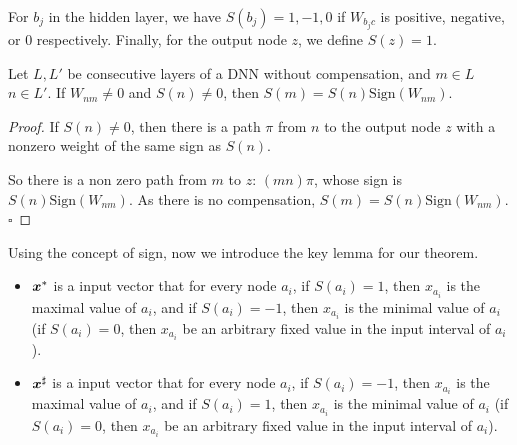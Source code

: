 For $b_j$ in the hidden layer, we have $S(b_j)=1,-1,0$ if $W_{b_j c}$ is positive, negative, or 0 respectively. Finally, for the output node $z$, we define $S(z)=1$.



\begin{lemma}[Sign]
	\label{lemma1}
	Let $L,L'$ be consecutive layers of a DNN without compensation, 
	and $m\in L$ $n\in L'$. If
	$W_{nm} \neq 0$ and $S(n) \neq 0$, then 
	$S(m)=S(n)\mathrm{Sign}(W_{n m})$.
\end{lemma}

\begin{proof}
	If $S(n) \neq 0$, then there is a path $\pi$ from $n$ to the output node $z$ with a nonzero weight of the same sign as $S(n)$. 
	
	So there is a non zero path from $m$ to $z$: $(m n) \pi$, whose sign is 
	$S(n)\mathrm{Sign}(W_{n m})$. As there is no compensation, $S(m)=S(n)\mathrm{Sign}(W_{n m})$.
	\hfill $\square$
\end{proof}



Using the concept of sign, now we introduce the key lemma for our theorem.

\begin{definition}
	
	\begin{itemize}
		\item $\boldsymbol{x}^{*}$ is a input vector that for every node $a_i$, if $S(a_i)=1$, then $x_{a_i}$ is the maximal value of $a_i$, and if $S(a_i)=-1$, then $x_{a_i}$ is the minimal value of $a_i$ (if $S(a_i)=0$, then $x_{a_i}$ be an arbitrary fixed value in the input interval of $a_i$).
		
		\item  $\boldsymbol{x}^{\sharp}$ is a input vector that for every node $a_i$, if $S(a_i)=-1$, then $x_{a_i}$ is the maximal value of $a_i$, and if $S(a_i)=1$, then $x_{a_i}$ is the minimal value of $a_i$ (if $S(a_i)=0$, then $x_{a_i}$ be an arbitrary fixed value in the input interval of $a_i$).
	\end{itemize}
	
	
	
\end{definition}

